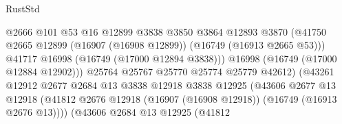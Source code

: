 \begin{lexlean}{RustStd}
\begin{coremodule}
                                              @2666
                                              @101
                                              @53
                                              @16
                                              @12899
                                              @3838
                                              @3850
                                              @3864
                                              @12893
                                              @3870
                                              (@41750
                                                @2665
                                                @12899
                                                (@16907 (@16908 @12899))
                                                (@16749 (@16913 @2665 @53)))
                                              @41717
                                              @16998
                                              (@16749 (@17000 @12894 @3838)))
                                            @16998
                                            (@16749 (@17000 @12884 @12902)))
                                          @25764
                                          @25767
                                          @25770
                                          @25774
                                          @25779
                                          @42612)
                                        (@43261
                                          @12912
                                          @2677
                                          @2684
                                          @13
                                          @3838
                                          @12918
                                          @3838
                                          @12925
                                          (@43606
                                            @2677
                                            @13
                                            @12918
                                            (@41812
                                              @2676
                                              @12918
                                              (@16907 (@16908 @12918))
                                              (@16749 (@16913 @2676 @13))))
                                          (@43606
                                            @2684
                                            @13
                                            @12925
                                            (@41812

\end{coremodule}
\end{lexlean}
